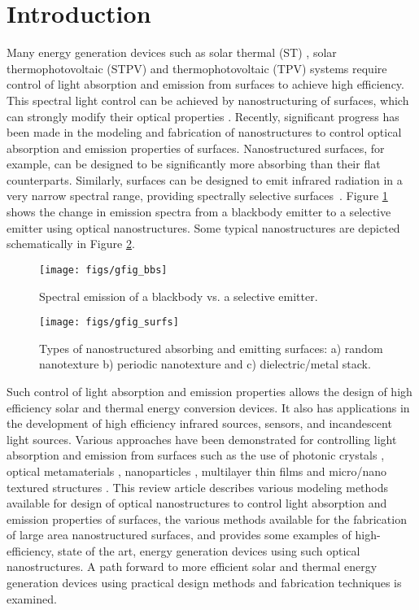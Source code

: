 \documentclass[10pt,letterpaper]{article}
\begin{document}
\section{Introduction}
Many energy generation devices such as solar thermal (ST) \cite{g1,g2}, solar thermophotovoltaic (STPV)  \cite{g3,g4,g5} and thermophotovoltaic (TPV) \cite{g6,g7} systems require control of light absorption and emission from surfaces to achieve high efficiency. This spectral light control can be achieved by nanostructuring of surfaces, which can strongly modify their optical properties \cite{g8,g9,RF_OptExp_2009}. Recently, significant progress has been made in the modeling and fabrication of nanostructures to control optical absorption and emission properties of surfaces. 
Nanostructured surfaces, for example, can be designed to be significantly
more absorbing than their flat counterparts.
Similarly, surfaces can be designed to emit infrared radiation in a very narrow spectral range, providing spectrally selective 
surfaces~\cite{G_PS_1985, C_RPP_2014}.  Figure \ref{gfig_bbs} shows the change in 
emission spectra from a blackbody emitter to a selective emitter using optical nanostructures.
Some typical nanostructures are depicted schematically in Figure \ref{gfig_surfs}.

\begin{figure}[h]
	\texttt{[image: figs/gfig\_bbs]}
	\caption{\label{gfig_bbs} Spectral emission of a blackbody vs. a selective emitter.} 
\end{figure}

\begin{figure}[h]
	\texttt{[image: figs/gfig\_surfs]}
	\caption{\label{gfig_surfs} Types of nanostructured absorbing and 
emitting surfaces: a) random nanotexture b) periodic nanotexture and c) dielectric/metal stack.} 
\end{figure}

Such control of light absorption and emission properties allows the design of high efficiency solar and thermal energy conversion devices. It also has applications in the development of 
high efficiency infrared sources, sensors, and incandescent light sources. 
Various approaches have been demonstrated for controlling light absorption and emission 
from surfaces such as the use of photonic crystals \cite{g11,NYL_SEMSC_2014,g13,g14}, 
optical metamaterials \cite{g15,g16,g17}, nanoparticles \cite{g18,g19,g20,g21}, 
multilayer thin films \cite{g22,RF_OptExp_2009} and micro/nano textured 
structures \cite{g25,g26,g27,g28}.  This review article describes various modeling methods 
available for design of optical nanostructures to control light absorption and emission properties of surfaces, the various methods available for the fabrication of large area nanostructured surfaces, and provides some examples of high-efficiency, state of the art, energy generation devices using such optical nanostructures.  A path forward to more efficient solar and thermal energy generation devices using practical design methods and fabrication techniques is examined.
\end{document}
